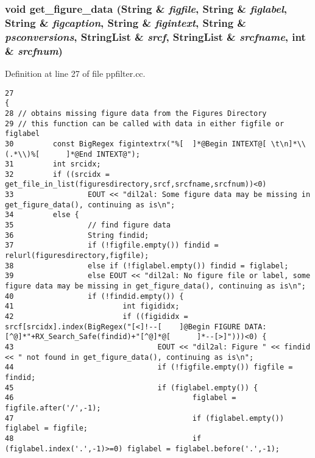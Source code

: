 \subsubsection{\setlength{\rightskip}{0pt plus 5cm}void get\_\-figure\_\-data ({\bf String} \& {\em figfile}, {\bf String} \& {\em figlabel}, {\bf String} \& {\em figcaption}, {\bf String} \& {\em figintext}, {\bf String} \& {\em psconversions}, {\bf String\-List} \& {\em srcf}, {\bf String\-List} \& {\em srcfname}, int \& {\em srcfnum})}\label{dil2al_8hh_a348}




Definition at line 27 of file ppfilter.cc.



\footnotesize\begin{verbatim}27                                                                                                                                                                                     {
28 // obtains missing figure data from the Figures Directory
29 // this function can be called with data in either figfile or figlabel
30         const BigRegex figintextrx("%[  ]*@Begin INTEXT@[ \t\n]*\\(.*\\)%[      ]*@End INTEXT@");
31         int srcidx;
32         if ((srcidx = get_file_in_list(figuresdirectory,srcf,srcfname,srcfnum))<0)
33                 EOUT << "dil2al: Some figure data may be missing in get_figure_data(), continuing as is\n";
34         else {
35                 // find figure data
36                 String findid;
37                 if (!figfile.empty()) findid = relurl(figuresdirectory,figfile);
38                 else if (!figlabel.empty()) findid = figlabel;
39                 else EOUT << "dil2al: No figure file or label, some figure data may be missing in get_figure_data(), continuing as is\n";
40                 if (!findid.empty()) {
41                         int figididx;
42                         if ((figididx = srcf[srcidx].index(BigRegex("[<]!--[    ]@Begin FIGURE DATA:[^@]*"+RX_Search_Safe(findid)+"[^@]*@[      ]*--[>]")))<0) {
43                                 EOUT << "dil2al: Figure " << findid << " not found in get_figure_data(), continuing as is\n";
44                                 if (!figfile.empty()) figfile = findid;
45                                 if (figlabel.empty()) {
46                                         figlabel = figfile.after('/',-1);
47                                         if (figlabel.empty()) figlabel = figfile;
48                                         if (figlabel.index('.',-1)>=0) figlabel = figlabel.before('.',-1);

\end{verbatim}

